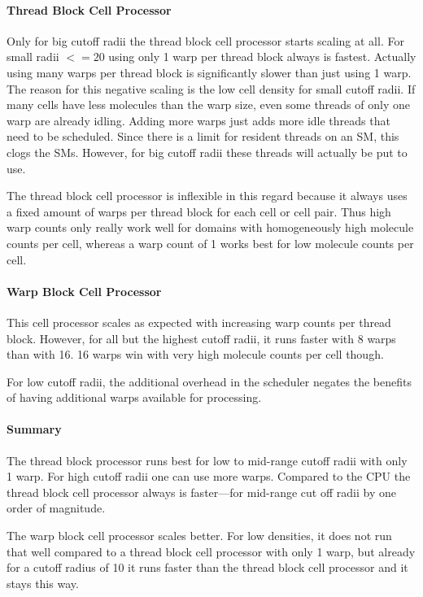 \paragraph{Thread Block Cell Processor}
Only for big cutoff radii the thread block cell processor starts scaling at all. For small radii $<= 20$ using only 1 warp per thread block always is fastest. Actually using many warps per thread block is significantly slower than just using 1 warp. The reason for this negative scaling is the low cell density for small cutoff radii. If many cells have less molecules than the warp size, even some threads of only one warp are already idling. Adding more warps just adds more idle threads that need to be scheduled. Since there is a limit for resident threads on an SM, this clogs the SMs.
However, for big cutoff radii these threads will actually be put to use.

The thread block cell processor is inflexible in this regard because it always uses a fixed amount of warps per thread block for each cell or cell pair. Thus high warp counts only really work well for domains with homogeneously high molecule counts per cell, whereas a warp count of 1 works best for low molecule counts per cell.

\paragraph{Warp Block Cell Processor}
This cell processor scales as expected with increasing warp counts per thread block. However, for all but the highest cutoff radii, it runs faster with 8 warps than with 16. 16 warps win with very high molecule counts per cell though.

For low cutoff radii, the additional overhead in the scheduler negates the benefits of having additional warps available for processing.

\paragraph{Summary}
The thread block processor runs best for low to mid-range cutoff radii with only 1 warp. For high cutoff radii one can use more warps.
Compared to the CPU the thread block cell processor always is faster---for mid-range cut off radii by one order of magnitude.

The warp block cell processor scales better. For low densities, it does not run that well compared to a thread block cell processor with only 1 warp, but already for a cutoff radius of 10 it runs faster than the thread block cell processor and it stays this way.

